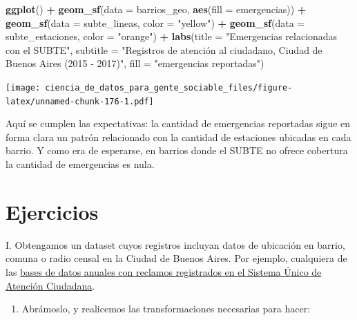 \documentclass[spanish,]{book}
\newenvironment{Shaded}{\begin{snugshade}}{\end{snugshade}}
\newcommand{\DataTypeTok}[1]{\textcolor[rgb]{0.13,0.29,0.53}{#1}}
\newcommand{\KeywordTok}[1]{\textcolor[rgb]{0.13,0.29,0.53}{\textbf{#1}}}
\newcommand{\NormalTok}[1]{#1}
\newcommand{\OperatorTok}[1]{\textcolor[rgb]{0.81,0.36,0.00}{\textbf{#1}}}
\newcommand{\StringTok}[1]{\textcolor[rgb]{0.31,0.60,0.02}{#1}}
\providecommand{\tightlist}{%
  \setlength{\itemsep}{0pt}\setlength{\parskip}{0pt}}
\begin{document}
\begin{Shaded}
\begin{Highlighting}[]
\KeywordTok{ggplot}\NormalTok{() }\OperatorTok{+}
\StringTok{    }\KeywordTok{geom_sf}\NormalTok{(}\DataTypeTok{data =}\NormalTok{ barrios_geo, }\KeywordTok{aes}\NormalTok{(}\DataTypeTok{fill =}\NormalTok{ emergencias)) }\OperatorTok{+}
\StringTok{    }\KeywordTok{geom_sf}\NormalTok{(}\DataTypeTok{data =}\NormalTok{ subte_lineas, }\DataTypeTok{color =} \StringTok{"yellow"}\NormalTok{) }\OperatorTok{+}
\StringTok{    }\KeywordTok{geom_sf}\NormalTok{(}\DataTypeTok{data =}\NormalTok{ subte_estaciones, }\DataTypeTok{color =} \StringTok{"orange"}\NormalTok{) }\OperatorTok{+}
\StringTok{    }\KeywordTok{labs}\NormalTok{(}\DataTypeTok{title =} \StringTok{"Emergencias relacionadas con el SUBTE"}\NormalTok{,}
         \DataTypeTok{subtitle =} \StringTok{"Registros de atención al ciudadano, Ciudad de Buenos Aires (2015 - 2017)"}\NormalTok{,}
         \DataTypeTok{fill =} \StringTok{"emergencias reportadas"}\NormalTok{)}
\end{Highlighting}
\end{Shaded}

\texttt{[image: ciencia\_de\_datos\_para\_gente\_sociable\_files/figure-latex/unnamed-chunk-176-1.pdf]}

Aquí se cumplen las expectativas: la cantidad de emergencias reportadas sigue en forma clara un patrón relacionado con la cantidad de estaciones ubicadas en cada barrio. Y como era de esperarse, en barrios donde el SUBTE no ofrece cobertura la cantidad de emergencias es nula.

\hypertarget{ejercicios-4}{%
\section{Ejercicios}\label{ejercicios-4}}

I. Obtengamos un dataset cuyos registros incluyan datos de ubicación en barrio, comuna o radio censal en la Ciudad de Buenos Aires. Por ejemplo, cualquiera de las \href{https://data.buenosaires.gob.ar/dataset/sistema-unico-atencion-ciudadana}{bases de datos anuales con reclamos registrados en el Sistema Único de Atención Ciudadana}.

\begin{enumerate}
\def\labelenumi{\Roman{enumi}.}
\setcounter{enumi}{1}
\tightlist
\item
  Abrámoslo, y realicemos las transformaciones necesarias para hacer:
\end{enumerate}
\end{document}
